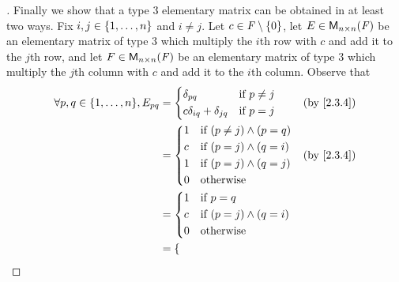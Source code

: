 \begin{proof}[]
  Finally we show that a type 3 elementary matrix can be obtained in at least two ways.
  Fix \(i, j \in \left\lbrace1, \dots, n\right\rbrace\) and \(i \neq j\).
  Let \(c \in \mathit{F} \setminus \left\lbrace0\right\rbrace\), let \(E \in \mathsf{M}_{{n} \times n}({\mathit{F}})\) be an elementary matrix of type 3 which multiply the \(i\)th row with \(c\) and add it to the \(j\)th row, and let \(F \in \mathsf{M}_{{n} \times n}({\mathit{F}})\) be an elementary matrix of type 3 which multiply the \(j\)th column with \(c\) and add it to the \(i\)th column.
  Observe that
  \begin{align*}
    \forall p, q \in \set{1, \dots, n}, E_{p q} & = \begin{dcases}
                                                      \delta_{p q}                  & \text{if } p \neq j \\
                                                      c \delta_{i q} + \delta_{j q} & \text{if } p = j
                                                    \end{dcases} &  & \text{(by \cref{2.3.4})}                                \\
                                                & = \begin{dcases}
                                                      1 & \text{if } (p \neq j) \land (p = q) \\
                                                      c & \text{if } (p = j) \land (q = i)    \\
                                                      1 & \text{if } (p = j) \land (q = j)    \\
                                                      0 & \text{otherwise}
                                                    \end{dcases}             &  & \text{(by \cref{2.3.4})}                             \\
                                                & = \begin{dcases}
                                                      1 & \text{if } p = q                 \\
                                                      c & \text{if } (p = j) \land (q = i) \\
                                                      0 & \text{otherwise}
                                                    \end{dcases}                                               \\
                                                & = \begin{dcases}

\end{dcases}
\end{align*}
\end{proof}
